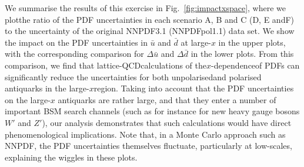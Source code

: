 We​ ​summarise​ ​the​ ​results​ ​of​ ​this​ ​exercise​ ​in​ ​Fig.~\ref{fig:impactxspace},​ ​where​ ​we​ ​plot​ ​the​ ​ratio​ ​of​ ​the​ ​PDF
uncertainties​ ​in​ ​each​ ​scenario​ ​A,​ ​B​ ​and​ ​C​ ​(D,​ ​E​ ​and​ ​F)​ ​to​ ​the​ ​uncertainty​ ​of​ ​the​ ​original
NNPDF3.1​ ​(NNPDFpol1.1)​ ​data​ ​set.
  We show the impact on the PDF uncertainties
  in $\bar{u}$ and $\bar{d}$ at large-$x$ in the upper
  plots, with the corresponding comparison for $\Delta\bar{u}$
  and $\Delta\bar{d}$ in the lower plots.
From​ ​this​ ​comparison,​ ​we​ ​find​ ​that​ ​lattice-QCD​ ​calculations​ ​of​ ​the​ ​$x$-dependence​ ​of​ ​PDFs
can​ ​significantly​ ​reduce​ ​the​ ​uncertainties​ ​for​ ​both​ ​unpolarised​ ​and​ ​polarised​ ​antiquarks​ ​in​ ​the
large-$x$​ ​region.
  Taking into account that the PDF uncertainties on the large-$x$
  antiquarks are rather large, and that they
  enter a number of important BSM search channels
  (such as for instance for new heavy gauge bosons $W'$ and $Z'$),
  our analysis demonstrates that such calculations would have direct
  phenomenological implications.
  Note that, in a Monte Carlo approach such as NNPDF, the
PDF uncertainties themselves fluctuate, particularly at low-scales,
explaining the wiggles in these plots.

